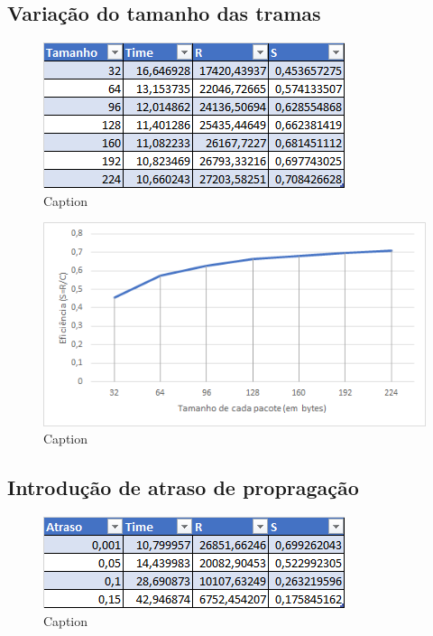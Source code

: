 \documentclass{article}
\begin{document}
\subsection{Variação do tamanho das tramas}

\begin{figure}[h]
	\includegraphics[width=\textwidth]{tabelaTamanho.png}
	\caption{Caption}
\end{figure}

\begin{figure}[h]
	\includegraphics[width=\textwidth]{tamanho.png}
	\caption{Caption}
\end{figure}

\subsection{Introdução de atraso de propragação}

\begin{figure}[h]
	\includegraphics[width=\textwidth]{tabelaAtraso.png}
	\caption{Caption}
\end{figure}
\end{document}
